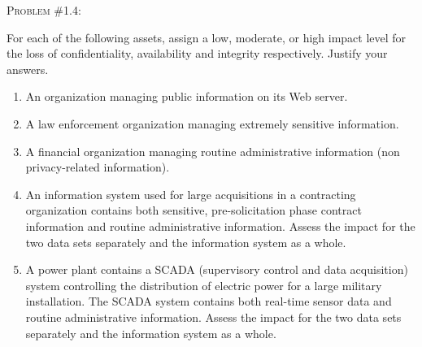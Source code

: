 \documentclass[12pt]{article}
\newenvironment{problem}[1]
{\begin{mdframed}[linewidth=0.6pt]
        \textsc{Problem #1:}

}
    {\end{mdframed}}
\begin{document}
	\begin{problem}{\#1.4}
		For each of the following assets, assign a low, moderate, or high impact level
		for the loss of confidentiality, availability and integrity respectively.
		Justify your answers.
		\begin{enumerate}[label=\alph*]
			\item An organization managing public information on its Web server.
			\item A law enforcement organization managing extremely sensitive
				information.
			\item A financial organization managing routine administrative
				information (non privacy-related information).
			\item An information system used for large acquisitions in a contracting
				organization contains both sensitive, pre-solicitation phase
				contract information and routine administrative information.
				Assess the impact for the two data sets separately and the 
				information system as a whole.
			\item A power plant contains a SCADA (supervisory control and data
				acquisition) system controlling the distribution of electric
				power for a large military installation. The SCADA system
				contains both real-time sensor data and routine administrative
				information. Assess the impact for the two data sets separately
				and the information system as a whole.
		\end{enumerate}
	\end{problem}
\end{document}
